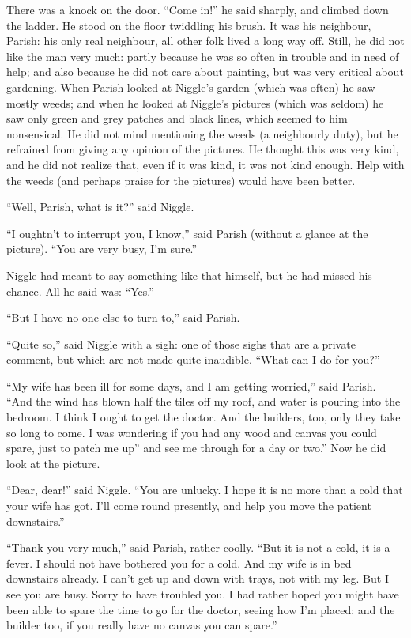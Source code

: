 \documentclass[english]{scrartcl}
\begin{document}
There was a knock on the door. “Come in!” he said sharply, and climbed down the ladder. He stood on the floor twiddling his brush. It was his neighbour, Parish: his only real neighbour, all other folk lived a long way off. Still, he did not like the man very much: partly because he was so often in trouble and in need of help; and also because he did not care about painting, but was very critical about gardening. When Parish looked at Niggle’s garden (which was often) he saw mostly weeds; and when he looked at Niggle’s pictures (which was seldom) he saw only green and grey patches and black lines, which seemed to him nonsensical. He did not mind mentioning the weeds (a neighbourly duty), but he refrained from giving any opinion of the pictures. He thought this was very kind, and he did not realize that, even if it was kind, it was not kind enough. Help with the weeds (and perhaps praise for the pictures) would have been better.

“Well, Parish, what is it?” said Niggle.

“I oughtn’t to interrupt you, I know,” said Parish (without a glance at the picture). “You are very busy, I’m sure.”

Niggle had meant to say something like that himself, but he had missed his chance. All he said was: “Yes.”

“But I have no one else to turn to,” said Parish.

“Quite so,” said Niggle with a sigh: one of those sighs that are a private comment, but which are not made quite inaudible. “What can I do for you?”

“My wife has been ill for some days, and I am getting worried,” said Parish. “And the wind has blown half the tiles off my roof, and water is pouring into the bedroom. I think I ought to get the doctor. And the builders, too, only they take so long to come. I was wondering if you had any wood and canvas you could spare, just to patch me up” and see me through for a day or two.” Now he did look at the picture.

“Dear, dear!” said Niggle. “You are unlucky. I hope it is no more than a cold that your wife has got. I’ll come round presently, and help you move the patient downstairs.”

“Thank you very much,” said Parish, rather coolly. “But it is not a cold, it is a fever. I should not have bothered you for a cold. And my wife is in bed downstairs already. I can’t get up and down with trays, not with my leg. But I see you are busy. Sorry to have troubled you. I had rather hoped you might have been able to spare the time to go for the doctor, seeing how I’m placed: and the builder too, if you really have no canvas you can spare.”
\end{document}
